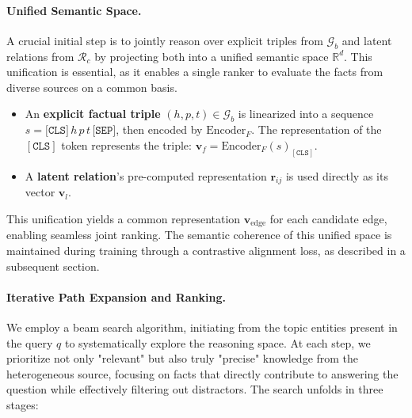 \documentclass[letterpaper]{article} %
\begin{document}
\paragraph{Unified Semantic Space.}
A crucial initial step is to jointly reason over explicit triples from $\mathcal{G}_b$ and latent relations from $\mathcal{R}_c$ by projecting both into a unified semantic space $\mathbb{R}^d$. This unification is essential, as it enables a single ranker to evaluate the facts from diverse sources on a common basis.
\begin{itemize}
    \item[] An \textbf{explicit factual triple} $(h, p, t) \in \mathcal{G}_b$ is linearized into a sequence $s = \texttt{[CLS]}\, h\, p\, t\, \texttt{[SEP]}$, then encoded by $\text{Encoder}_F$. The representation of the $\mathtt{[CLS]}$ token represents the triple: $\mathbf{v}_f = \text{Encoder}_F(s)_{[\mathtt{CLS}]}$.
    \item[] A \textbf{latent relation}'s pre-computed representation $\mathbf{r}_{ij}$ is used directly as its vector $\mathbf{v}_l$.
\end{itemize}
This unification yields a common representation $\mathbf{v}_{\text{edge}}$ for each candidate edge, enabling seamless joint ranking. The semantic coherence of this unified space is maintained during training through a contrastive alignment loss, as described in a subsequent section.

\paragraph{Iterative Path Expansion and Ranking.} 
We employ a beam search algorithm, initiating from the topic entities present in the query $q$ to systematically explore the reasoning space. At each step, we prioritize not only "relevant" but also truly "precise" knowledge from the heterogeneous source, focusing on facts that directly contribute to answering the question while effectively filtering out distractors. The search unfolds in three stages:
\end{document}

